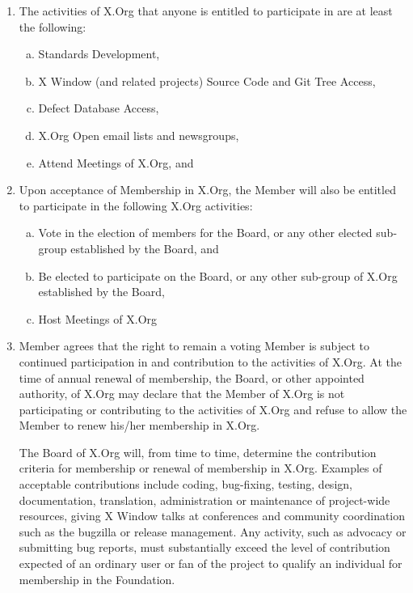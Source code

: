 \documentclass[10pt, english]{xorgdocs}
\begin{document}
\begin{enumerate}[(1)\hspace{.2cm}]
	\item The activities of X.Org that anyone is entitled to participate
	in are at least the following:

	\begin{enumerate}[(a)\hspace{.2cm}]
		\item Standards Development,
		\item X Window (and related projects) Source Code and Git
		Tree Access,
		\item Defect Database Access,
		\item X.Org Open email lists and newsgroups,
		\item Attend Meetings of X.Org, and
	\end{enumerate}

	\item Upon acceptance of Membership in X.Org, the Member will also be
	entitled to participate in the following X.Org activities:

	\begin{enumerate}[(a)\hspace{.2cm}]
		\item Vote in the election of members for the Board, or any
		other elected sub-group established by the Board, and
		\item Be elected to participate on the Board, or any other
		sub-group of X.Org established by the Board,
		\item Host Meetings of X.Org
	\end{enumerate}

	\item Member agrees that the right to remain a voting Member is
	subject to continued participation in and contribution to the
	activities of X.Org. At the time of annual renewal of membership,
	the Board, or other appointed authority, of X.Org may declare that
	the Member of X.Org is not participating or contributing to the
	activities of X.Org and refuse to allow the Member to renew his/her
	membership in X.Org.

	The Board of X.Org will, from time to time, determine the contribution
	criteria for membership or renewal of membership in X.Org. Examples
	of acceptable contributions include coding, bug-fixing, testing,
	design, documentation, translation, administration or maintenance of
	project-wide resources, giving X Window talks at conferences and
	community coordination such as the bugzilla or release management.
	Any activity, such as advocacy or submitting bug reports, must
	substantially exceed the level of contribution expected of an ordinary
	user or fan of the project to qualify an individual for membership in
	the Foundation.


\end{enumerate}
\end{document}
